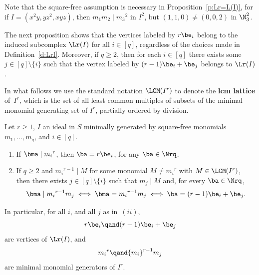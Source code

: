 \begin{rema} Note that the square-free assumption is necessary
  in Proposition~\ref{p:Lr=L(I)}, for if $I = (x^2y, yz^2, xyz)$, then $m_1m_2
  \mid {m_3}^2$ in $I^2$, but $(1, 1, 0) \neq (0,0,2)$ in
  $\N_3^2$.
\end{rema}


The next proposition shows that the vertices labeled by $r\be_i$ belong
to the induced subcomplex $\Lr(I)$ for all $i\in [q]$, regardless of
the choices made in Definition~\ref{d:LrI}. Moreover, if $q\geq 2$, then for
each $i\in [q]$ there exists some $j\in[q]\setminus \{i\}$ such that
the vertex labeled by $(r-1)\be_i + \be_j$ belongs to $\Lr(I)$.

In what follows we use the standard notation $\LCM(I^r)$ to denote the
{\bf lcm lattice} of~$I^r$, which is the set of all least common
multiples of subsets of the minimal monomial generating set of $I^r$,
partially ordered by division.

\begin{prop}\label{p:irredundant-gens-Ir}
Let $r \geq 1$, $I$ an ideal in $S$ minimally generated by square-free
monomials $m_1,\ldots,m_q$, and $i\in[q]$.
\begin{enumerate}[label=\textup{(}\roman*\textup{)}]
\item If $\bma \mid {m_i}^r$, then $\ba=r\be_i$, for any $\ba \in \Nrq$.
\item If $q \geq 2$ and ${m_i}^{r-1} \mid M$ for some monomial $M \neq {m_i}^r$ with $M \in \LCM(I^r)$, then there exists $j\in [q]\setminus \{i\}$ such that $m_j
  \mid M$ and, for every $\ba \in \Nrq$,
  $$\bma \mid {m_i}^{r-1}m_j \iff
    \bma =    {m_i}^{r-1}m_j    \iff
    \ba=(r-1)\be_i+\be_j.
  $$
\end{enumerate}

In particular, for all $i$, and all $j$ as in~$(ii)$,
$$r\be_i \qand (r-1)\be_i+\be_j$$ are vertices of $\Lr(I)$, and
$${m_i}^r \qand {m_i}^{r-1}m_j$$ are minimal monomial
generators of $I^r$.
\end{prop}



